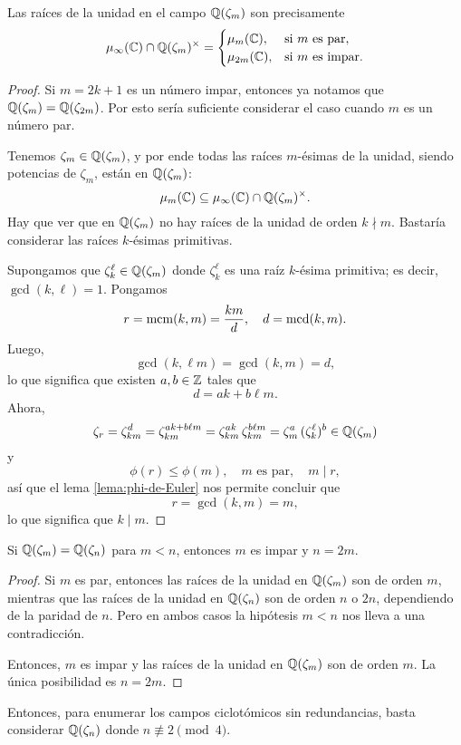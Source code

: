 \begin{proposicion}
  Las raíces de la unidad en el campo $\mathbb{Q} (\zeta_m)$ son precisamente
  \[ \mu_\infty (\mathbb{C}) \cap \mathbb{Q} (\zeta_m)^\times = \begin{cases}
    \mu_m (\mathbb{C}), & \text{si }m\text{ es par},\\
    \mu_{2m} (\mathbb{C}), & \text{si }m\text{ es impar}.
  \end{cases} \]

  \begin{proof}
    Si $m = 2k+1$ es un número impar, entonces ya notamos que
    $\mathbb{Q} (\zeta_m) = \mathbb{Q} (\zeta_{2m})$. Por esto sería suficiente considerar
    el caso cuando $m$ es un número par.

    Tenemos $\zeta_m \in \mathbb{Q} (\zeta_m)$, y por ende todas las raíces $m$-ésimas
    de la unidad, siendo potencias de $\zeta_m$, están en $\mathbb{Q} (\zeta_m)$:
    $$\mu_m (\mathbb{C}) \subseteq \mu_\infty (\mathbb{C}) \cap \mathbb{Q} (\zeta_m)^\times.$$
    Hay que ver que en $\mathbb{Q} (\zeta_m)$ no hay raíces de la unidad de orden
    $k\nmid m$. Bastaría considerar las raíces $k$-ésimas primitivas.

    Supongamos que $\zeta_k^\ell \in \mathbb{Q} (\zeta_m)$ donde $\zeta_k^\ell$ es una
    raíz $k$-ésima primitiva; es decir, $\gcd (k,\ell) = 1$. Pongamos
    $$r = \operatorname{mcm} (k,m) = \frac{km}{d}, \quad d = \operatorname{mcd} (k,m).$$
    Luego,
    $$\gcd (k,\ell m) = \gcd (k,m) = d,$$
    lo que significa que existen $a,b \in \mathbb{Z}$ tales que
    $$d = a k + b\ell m.$$
    Ahora,
    \[ \zeta_r = \zeta_{km}^d
               = \zeta_{km}^{ak + b\ell m}
               = \zeta_{km}^{ak}\,\zeta_{km}^{b\ell m}
               = \zeta_m^a\,(\zeta_k^\ell)^b \in \mathbb{Q} (\zeta_m) \]
    y
    $$\phi (r) \le \phi (m), \quad m\text{ es par}, \quad m \mid r,$$
    así que el lema \ref{lema:phi-de-Euler} nos permite concluir que
    $$r = \gcd (k,m) = m,$$
    lo que significa que $k \mid m$.
  \end{proof}
\end{proposicion}

\begin{corolario}
  Si $\mathbb{Q} (\zeta_m) = \mathbb{Q} (\zeta_n)$ para $m < n$, entonces $m$ es impar y
  $n = 2m$.

  \begin{proof}
    Si $m$ es par, entonces las raíces de la unidad en $\mathbb{Q} (\zeta_m)$ son de
    orden $m$, mientras que las raíces de la unidad en $\mathbb{Q} (\zeta_n)$ son de
    orden $n$ o $2n$, dependiendo de la paridad de $n$. Pero en ambos casos la
    hipótesis $m < n$ nos lleva a una contradicción.

    Entonces, $m$ es impar y las raíces de la unidad en $\mathbb{Q} (\zeta_m)$ son de
    orden $m$. La única posibilidad es $n = 2m$.
  \end{proof}
\end{corolario}

Entonces, para enumerar los campos ciclotómicos sin redundancias, basta
considerar $\mathbb{Q} (\zeta_n)$ donde $n \not\equiv 2\pmod{4}$.
